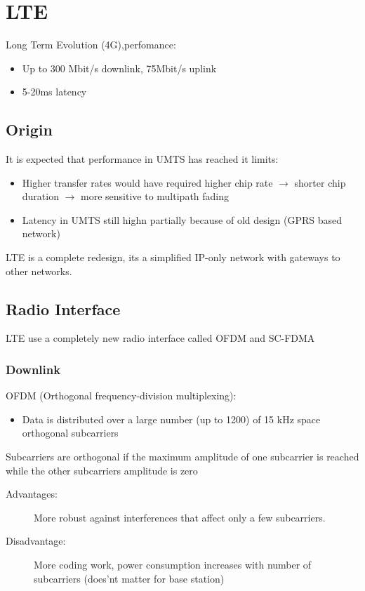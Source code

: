 
\section{LTE}
Long Term Evolution (4G),perfomance:
\begin{itemize}
	\item Up to 300 Mbit/s downlink, 75Mbit/s uplink
	\item 5-20ms latency
\end{itemize}
\subsection{Origin}
It is expected that performance in UMTS has reached it limits:
\begin{itemize}
	\item Higher transfer rates would have required higher chip
	rate $\to$ shorter chip duration $\to$ more sensitive to
	multipath fading
	\item Latency in UMTS still highn partially because of old
	design (GPRS based network)
\end{itemize}
LTE is a complete redesign, its a simplified IP-only network with
gateways to other networks.

\subsection{Radio Interface}
LTE use a completely new radio interface called OFDM and SC-FDMA
\subsubsection{Downlink}
OFDM (Orthogonal frequency-division multiplexing):
\begin{itemize}
	\item Data is distributed over a large number (up to 1200) of 15 kHz
	space orthogonal subcarriers
	
\end{itemize}
Subcarriers are orthogonal if the maximum amplitude of one subcarrier
is reached while the other subcarriers amplitude is zero	
\begin{description}
	\item[Advantages:] More robust against interferences that affect only a 
	few subcarriers.
	
	\item[Disadvantage:] More coding work, power consumption increases
	with number of subcarriers (does'nt matter for base station)

\end{description}

